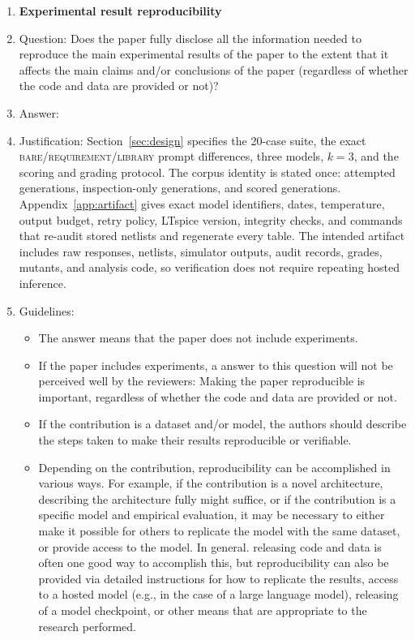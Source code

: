 \begin{enumerate}
    \item {\bf Experimental result reproducibility}
    \item[] Question: Does the paper fully disclose all the information needed to reproduce the main experimental results of the paper to the extent that it affects the main claims and/or conclusions of the paper (regardless of whether the code and data are provided or not)?
    \item[] Answer: \answerYes{}
    \item[] Justification: Section~\ref{sec:design} specifies the 20-case suite, the exact \textsc{bare}/\textsc{requirement}/\textsc{library} prompt differences, three models, $k=3$, and the scoring and grading protocol. The corpus identity is stated once: \CorpusTotal{} attempted generations, \CorpusExcluded{} inspection-only generations, and \CorpusScored{} scored generations. Appendix~\ref{app:artifact} gives exact model identifiers, dates, temperature, output budget, retry policy, LTspice version, integrity checks, and commands that re-audit stored netlists and regenerate every table. The intended artifact includes raw responses, netlists, simulator outputs, audit records, grades, mutants, and analysis code, so verification does not require repeating hosted inference.
    \item[] Guidelines:
    \begin{itemize}
        \item The answer \answerNA{} means that the paper does not include experiments.
        \item If the paper includes experiments, a \answerNo{} answer to this question will not be perceived well by the reviewers: Making the paper reproducible is important, regardless of whether the code and data are provided or not.
        \item If the contribution is a dataset and\slash or model, the authors should describe the steps taken to make their results reproducible or verifiable. 
        \item Depending on the contribution, reproducibility can be accomplished in various ways. For example, if the contribution is a novel architecture, describing the architecture fully might suffice, or if the contribution is a specific model and empirical evaluation, it may be necessary to either make it possible for others to replicate the model with the same dataset, or provide access to the model. In general. releasing code and data is often one good way to accomplish this, but reproducibility can also be provided via detailed instructions for how to replicate the results, access to a hosted model (e.g., in the case of a large language model), releasing of a model checkpoint, or other means that are appropriate to the research performed.

\end{itemize}
\end{enumerate}
